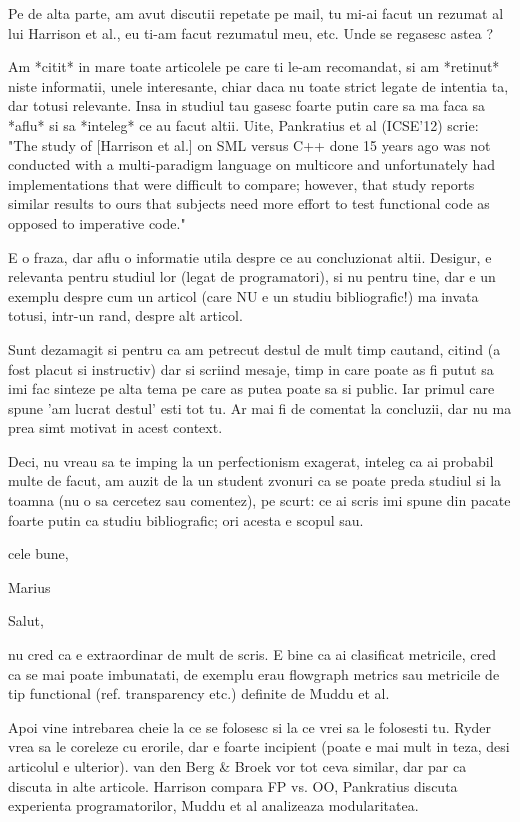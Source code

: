 \documentclass{article}
\begin{document}
Pe de alta parte, am avut discutii repetate pe mail, tu mi-ai facut
un rezumat al lui Harrison et al., eu ti-am facut rezumatul meu, etc.
Unde se regasesc astea ?

Am *citit* in mare toate articolele pe care ti le-am recomandat, si
am *retinut* niste informatii, unele interesante, chiar daca nu toate
strict legate de intentia ta, dar totusi relevante. Insa in studiul
tau gasesc foarte putin care sa ma faca sa *aflu* si sa *inteleg*
ce au facut altii. Uite, Pankratius et al (ICSE'12) scrie:
"The study of [Harrison et al.] on SML versus C++ done 15 years ago
was not conducted with a multi-paradigm language on multicore and
unfortunately had implementations that were difficult to compare;
however, that study reports similar results to ours that subjects
need more effort to test functional code as opposed to imperative code."


E o fraza, dar aflu o informatie utila despre ce au concluzionat altii.
Desigur, e relevanta pentru studiul lor (legat de programatori), si
nu pentru tine, dar e un exemplu despre cum un articol (care NU e un
studiu bibliografic!) ma invata totusi, intr-un rand, despre alt articol.

Sunt dezamagit si pentru ca am petrecut destul de mult timp cautand,
citind (a fost placut si instructiv) dar si scriind mesaje, timp in care
poate as fi putut sa imi fac sinteze pe alta tema pe care as putea poate
sa si public. Iar primul care spune 'am lucrat destul' esti tot tu.
Ar mai fi de comentat la concluzii, dar nu ma prea simt motivat
in acest context.

Deci, nu vreau sa te imping la un perfectionism exagerat, inteleg ca
ai probabil multe de facut, am auzit de la un student zvonuri ca se
poate preda studiul si la toamna (nu o sa cercetez sau comentez),
pe scurt: ce ai scris imi spune din pacate foarte putin ca studiu
bibliografic; ori acesta e scopul sau.

cele bune,

Marius



Salut,

nu cred ca e extraordinar de mult de scris.
E bine ca ai clasificat metricile, cred ca se mai poate imbunatati,
de exemplu erau flowgraph metrics sau metricile de tip functional
(ref. transparency etc.) definite de Muddu et al.

Apoi vine intrebarea cheie la ce se folosesc si la ce vrei sa le
folosesti tu. Ryder vrea sa le coreleze cu erorile, dar e foarte
incipient (poate e mai mult in teza, desi articolul e ulterior).
van den Berg \& Broek vor tot ceva similar, dar par ca discuta in alte
articole. Harrison compara FP vs. OO, Pankratius discuta experienta
programatorilor, Muddu et al analizeaza modularitatea.
\end{document}
